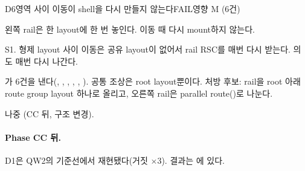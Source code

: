 \begin{checkitem}{\ckopen}{D6}{영역 사이 이동이 shell을 다시 만들지 않는다}{FAIL\ckdot{}영향 M (6건)}
  \item[What] 왼쪽 rail은 한 layout에 한 번 놓인다. 이동 때 다시 mount하지 않는다.
  \item[Why] S1. 형제 layout 사이 이동은 공유 layout이 없어서 rail RSC를 매번 다시 받는다. 의 도 매번 다시 나간다.
  \item[How] 가 6건을 낸다(, , , , , ). 공통 조상은 root layout뿐이다. 처방 후보: rail을 root 아래 route group layout 하나로 올리고, 오른쪽 rail은 parallel route()로 나눈다.
  \item[When] 나중 (CC 뒤, 구조 변경).
\end{checkitem}

\paragraph{Phase CC 뒤.}
D1은 QW2의 기준선에서 재현됐다(거짓 $\times$3). 결과는 에 있다.
